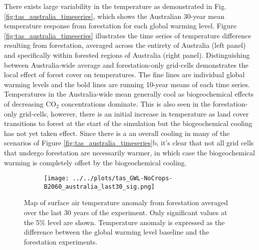 \documentclass[]{article}
\begin{document}
There exists large variability in the temperature as demonstrated in Fig. \ref{fig:tas_australia_timeseries}, which shows the Australian 30-year mean temperature response from forestation for each global warming level.
Figure \ref{fig:tas_australia_timeseries} illustrates the time series of temperature difference resulting from forestation, averaged across the entirety of Australia (left panel) and specifically within forested regions of Australia (right panel).
Distinguishing between Australia-wide average and forestation-only grid-cells demonstrates the local effect of forest cover on temperatures.
The fine lines are individual global warming levels and the bold lines are running 10-year means of each time series.
Temperatures in the Australia-wide mean generally cool as biogeochemical effects of decreasing CO$_2$ concentrations dominate.
This is also seen in the forestation-only grid-cells, however, there is an initial increase in temperature as land cover transitions to forest at the start of the simulation but the biogeochemical cooling has not yet taken effect.
Since there is a an overall cooling in many of the scenarios of Figure \ref{fig:tas_australia_timeseries}b, it's clear that not all grid cells that undergo forestation are necessarily warmer, in which case the biogeochemical warming is completely offset by the biogeochemical cooling.

\begin{figure}[H]
    \centering
    \begin{subfigure}[b]{\linewidth}
        \texttt{[image: ../../plots/tas\_GWL-NoCrops-B2060\_australia\_last30\_sig.png]}
    \end{subfigure}
    \caption{Map of surface air temperature anomaly from forestation averaged over the last 30 years of the experiment. Only significant values at the 5\% level are shown. Temperature anomaly is expressed as the difference between the global warming level baseline and the forestation experiments.}
    \label{fig:tas_australia_map}
\end{figure}
\end{document}
